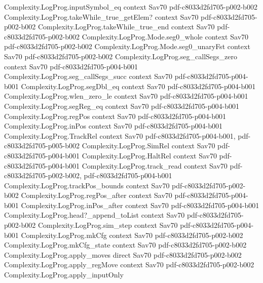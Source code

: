 \begin{theorem}
\proofstep
  {Complexity.LogProg.inputSymbol_eq}
  {context}
  {Sav70}
  {pdf-c8033d2fd705-p002-b002}
\proofstep
  {Complexity.LogProg.takeWhile_true_getElem?}
  {context}
  {Sav70}
  {pdf-c8033d2fd705-p002-b002}
\proofstep
  {Complexity.LogProg.takeWhile_true_end}
  {context}
  {Sav70}
  {pdf-c8033d2fd705-p002-b002}
\proofstep
  {Complexity.LogProg.Mode.seg0_whole}
  {context}
  {Sav70}
  {pdf-c8033d2fd705-p002-b002}
\proofstep
  {Complexity.LogProg.Mode.seg0_unaryFst}
  {context}
  {Sav70}
  {pdf-c8033d2fd705-p002-b002}
\proofstep
  {Complexity.LogProg.seg_callSegs_zero}
  {context}
  {Sav70}
  {pdf-c8033d2fd705-p004-b001}
\proofstep
  {Complexity.LogProg.seg_callSegs_succ}
  {context}
  {Sav70}
  {pdf-c8033d2fd705-p004-b001}
\proofstep
  {Complexity.LogProg.segDbl_eq}
  {context}
  {Sav70}
  {pdf-c8033d2fd705-p004-b001}
\proofstep
  {Complexity.LogProg.wlen_zero_le}
  {context}
  {Sav70}
  {pdf-c8033d2fd705-p004-b001}
\proofstep
  {Complexity.LogProg.segReg_eq}
  {context}
  {Sav70}
  {pdf-c8033d2fd705-p004-b001}
\proofstep
  {Complexity.LogProg.regPos}
  {context}
  {Sav70}
  {pdf-c8033d2fd705-p004-b001}
\proofstep
  {Complexity.LogProg.inPos}
  {context}
  {Sav70}
  {pdf-c8033d2fd705-p004-b001}
\proofstep
  {Complexity.LogProg.TrackRel}
  {context}
  {Sav70}
  {pdf-c8033d2fd705-p004-b001,
    pdf-c8033d2fd705-p005-b002}
\proofstep
  {Complexity.LogProg.SimRel}
  {context}
  {Sav70}
  {pdf-c8033d2fd705-p004-b001}
\proofstep
  {Complexity.LogProg.HaltRel}
  {context}
  {Sav70}
  {pdf-c8033d2fd705-p004-b001}
\proofstep
  {Complexity.LogProg.track_read}
  {context}
  {Sav70}
  {pdf-c8033d2fd705-p002-b002,
    pdf-c8033d2fd705-p004-b001}
\proofstep
  {Complexity.LogProg.trackPos_bounds}
  {context}
  {Sav70}
  {pdf-c8033d2fd705-p002-b002}
\proofstep
  {Complexity.LogProg.regPos_after}
  {context}
  {Sav70}
  {pdf-c8033d2fd705-p004-b001}
\proofstep
  {Complexity.LogProg.inPos_after}
  {context}
  {Sav70}
  {pdf-c8033d2fd705-p004-b001}
\proofstep
  {Complexity.LogProg.head?_append_toList}
  {context}
  {Sav70}
  {pdf-c8033d2fd705-p002-b002}
\proofstep
  {Complexity.LogProg.sim_step}
  {context}
  {Sav70}
  {pdf-c8033d2fd705-p004-b001}
\proofstep
  {Complexity.LogProg.mkCfg}
  {context}
  {Sav70}
  {pdf-c8033d2fd705-p002-b002}
\proofstep
  {Complexity.LogProg.mkCfg_state}
  {context}
  {Sav70}
  {pdf-c8033d2fd705-p002-b002}
\proofstep
  {Complexity.LogProg.apply_moves}
  {direct}
  {Sav70}
  {pdf-c8033d2fd705-p002-b002}
\proofstep
  {Complexity.LogProg.apply_regMove}
  {context}
  {Sav70}
  {pdf-c8033d2fd705-p002-b002}
\proofstep
  {Complexity.LogProg.apply_inputOnly}

\end{theorem}
